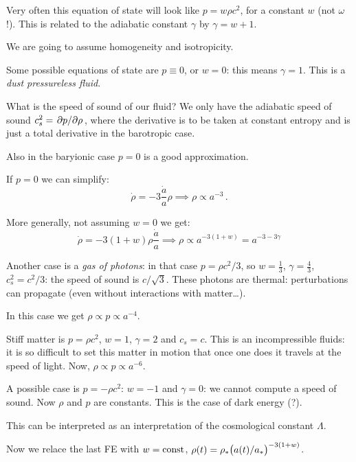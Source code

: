 \documentclass[main.tex]{subfiles}
\begin{document}
Very often this equation of state will look like \(p = w \rho c^2\), for a constant \(w\) (not \(\omega\)!). This is related to the adiabatic constant \(\gamma\) by \(\gamma = w+1\).

We are going to assume homogeneity and isotropicity.

Some possible equations of state are \(p \equiv 0\), or \(w =0\): this means \(\gamma =1 \). This is a \emph{dust pressureless fluid}.

What is the speed of sound of our fluid? We only have the adiabatic speed of sound \(c_s^2 = \pdv*{p}{\rho}\), where the derivative is to be taken at constant entropy and is just a total derivative in the barotropic case.

Also in the baryionic case \(p=0\) is a good approximation.

If \(p=0\) we can simplify:
\begin{equation}
  \dot{\rho} = -3 \frac{\dot{a} }{a} \rho \implies 
  \rho \propto a^{-3}\,.
\end{equation}

More generally, not assuming \(w=0\) we get:
\begin{equation}
  \dot{\rho} = -3 (1+w) \rho \frac{\dot{a} }{a} \implies \rho \propto a^{-3 (1+w)} = a^{-3 -3\gamma}
\end{equation}

Another case is a \emph{gas of photons}: in that case \(p = \rho c^2 / 3\), so \(w=\frac{1}{3} \), \(\gamma = \frac{4}{3} \), \(c_{s}^2 = c^2 / 3 \): the speed of sound is \(c / \sqrt{3} \). These photons are thermal: perturbations can propagate (even without interactions with matter\dots). 

In this case we get \(\rho \propto p \propto a^{-4}\).

Stiff matter is \(p = \rho c^2\), \(w=1\), \(\gamma=2\) and \(c_s = c\). This is an incompressible fluids: it is so difficult to set this matter in motion that once one does it travels at the speed of light. Now, \(\rho \propto p \propto a^{-6}\).

A possible case is \(p = - \rho c^2\): \(w = -1\) and \(\gamma = 0\): we cannot compute a speed of sound. Now \(\rho\) and \(p\) are constants. This is the case of dark energy (?).

This can be interpreted as an interpretation of the cosmological constant \(\Lambda\).

Now we relace the last FE with \(w = \text{const}\), \(\rho(t) = \rho_{*} \qty(a(t) / a_{*})^{-3(1+w)}  \).
\end{document}
